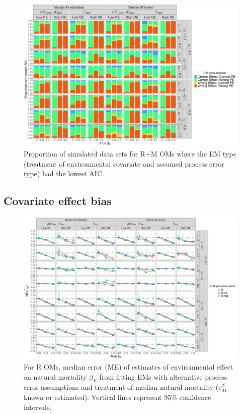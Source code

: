 \documentclass[
  12pt,
]{article}
\begin{document}
\begin{landscape}
\begin{figure}
\begin{center}
\includegraphics[height = \textheight]{aic_RMom}
\end{center}
\caption{Proportion of simulated data sets for R+M OMs where the EM type (treatment of environmental covariate and assumed process error type) had the lowest AIC.}\label{aic_RMom}
\end{figure}
\end{landscape}

\hypertarget{covariate-effect-bias}{%
\subsection*{Covariate effect bias}\label{covariate-effect-bias}}

\begin{landscape}
\begin{figure}
\begin{center}
\includegraphics[height = \textheight]{beta_E_bias_Rom}
\end{center}
\caption{For R OMs, median error (ME) of estimates of environmental effect on natural mortality $\beta_E$ from fitting EMs with alternative process error assumptions and treatment of median natural mortality ($e^\beta_M$ known or estimated). Vertical lines represent 95\% confidence intervals.}\label{beta_E_bias_Rom}
\end{figure}
\end{landscape}
\end{document}
